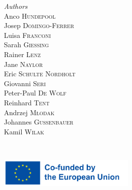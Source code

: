 	\begin{minipage}{0.4\textwidth}
		\begin{flushleft}
			\large
			\textit{Authors}\\
			Anco \textsc{Hundepool}\\
    		Josep \textsc{Domingo-Ferrer}\\
    		Luisa \textsc{Franconi}\\
    		Sarah \textsc{Giessing}\\
    		Rainer \textsc{Lenz}\\
    		Jane \textsc{Naylor}\\
    		Eric \textsc{Schulte Nordholt}\\
    		Giovanni \textsc{Seri}\\
    		Peter-Paul \textsc{De Wolf}\\
    		Reinhard \textsc{Tent}\\
    		Andrzej \textsc{Młodak}\\
    		Johannes \textsc{Gussenbauer}\\
    		Kamil \textsc{Wilak}
		\end{flushleft}
	\end{minipage}
	~
	\begin{minipage}{0.4\textwidth}
		\begin{flushright}
			\large
		\end{flushright}
	\end{minipage}
	
	
	
	\vfill\vfill\vfill %
	
	
	\vfill\vfill
	\includegraphics[width=0.5\textwidth]{Images/media/eu_funded.png}\\[1cm] %
	 
